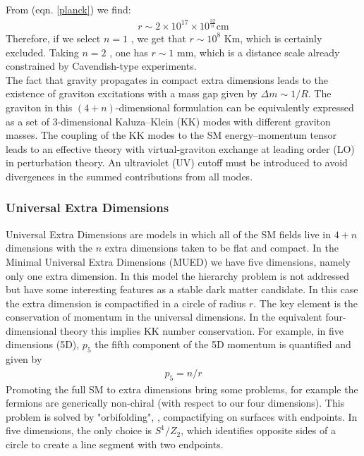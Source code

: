 From (eqn. \ref{planck}) we find:
\begin{eqnarray}
r \sim 2\times 10^{17}\times 10^{\frac{32}{n}} \text{cm}
\end{eqnarray}
Therefore, if we select $n=1$ , we get that $r\sim 10^{8}$ Km, which is certainly excluded. Taking $n=2$ , one has $r \sim 1$ mm, which is a distance scale already constrained by Cavendish-type experiments.\\
\indent
The fact that gravity propagates in compact extra dimensions leads to the existence of graviton excitations with a mass gap given by $\Delta m \sim 1/R$.
The graviton in this $(4+n)$-dimensional formulation can be equivalently expressed as a set of 3-dimensional Kaluza–Klein (KK) modes  with different graviton masses. The coupling of the KK modes to the SM energy–momentum tensor leads to an effective theory with virtual-graviton exchange at leading order (LO) in perturbation theory. An ultraviolet (UV) cutoff must be introduced to avoid divergences in the summed contributions from all modes.


\subsubsection{Universal Extra Dimensions}

Universal Extra Dimensions \cite{UED} are models in which all of the SM fields live in $4+n$ dimensions with the $n$ extra dimensions taken to be flat and compact. 
In the Minimal Universal Extra Dimensions (MUED) we have five dimensions, namely only one extra dimension. In this model the hierarchy problem is not addressed but have some interesting features as a stable dark matter candidate.
In this case the extra dimension is compactified in a circle of radius $r$. 
The key element is the conservation of momentum in the universal dimensions. In the equivalent four-dimensional theory this implies KK number conservation. For example, in five dimensions (5D), $p_{5}$ the fifth component of the 5D momentum is quantified and given by
\begin{eqnarray}
p_{5} = n/r
\end{eqnarray}
Promoting the full SM to extra dimensions bring some problems, for example the fermions are generically non-chiral (with respect to our four dimensions). This problem is solved by "orbifolding", \ie, compactifying on surfaces with endpoints. In five dimensions, the only choice is $S^{1}/Z_{2}$, which identifies opposite sides of a circle to create a line segment with two endpoints.

